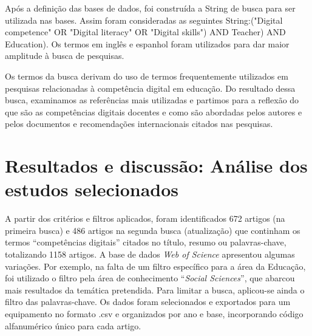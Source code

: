 \documentclass[portuguese]{textolivre}
\begin{document}
Após a definição das bases de dados, foi construída a String de busca
para ser utilizada nas bases. Assim foram consideradas as seguintes
String:("Digital competence" OR "Digital literacy" OR "Digital skills")
AND Teacher) AND Education). Os termos em inglês e espanhol foram
utilizados para dar maior amplitude à busca de pesquisas.

Os termos da busca derivam do uso de termos frequentemente utilizados em
pesquisas relacionadas à competência digital em educação. Do resultado
dessa busca, examinamos as referências mais utilizadas e partimos para a
reflexão do que são as competências digitais docentes e como são
abordadas pelos autores e pelos documentos e recomendações
internacionais citados nas pesquisas.




\section{Resultados e discussão: Análise dos estudos
selecionados}

A partir dos critérios e filtros aplicados, foram identificados 672
artigos (na primeira busca) e 486 artigos na segunda busca (atualização)
que continham os termos ``competências digitais'' citados no título,
resumo ou palavras-chave, totalizando 1158 artigos. A base de dados
\emph{Web of Science} apresentou algumas variações. Por exemplo, na
falta de um filtro específico para a área da Educação, foi utilizado o
filtro pela área de conhecimento ``\emph{Social Sciences}'', que abarcou
mais resultados da temática pretendida. Para limitar a busca, aplicou-se
ainda o filtro das palavras-chave. Os dados foram selecionados e
exportados para um equipamento no formato .csv e organizados por ano e
base, incorporando código alfanumérico único para cada artigo.
\end{document}
